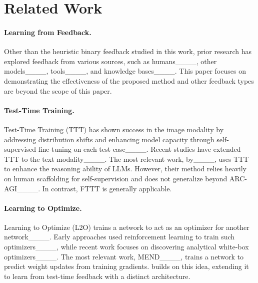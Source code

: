 \section{Related Work}
\paragraph{Learning from Feedback.}

Other than the heuristic binary feedback studied in this work, prior research has explored feedback from various sources, such as humans____, other models____, tools____, and knowledge bases____. This paper focuses on demonstrating the effectiveness of the proposed method and other feedback types are beyond the scope of this paper.

\paragraph{Test-Time Training.}

Test-Time Training (TTT) has shown success in the image modality by addressing distribution shifts and enhancing model capacity through self-supervised fine-tuning on each test case____. Recent studies have extended TTT to the text modality____. The most relevant work, by____, uses TTT to enhance the reasoning ability of LLMs. However, their method relies heavily on human scaffolding for self-supervision and does not generalize beyond ARC-AGI____. In contrast, FTTT is generally applicable.

\paragraph{Learning to Optimize.}

Learning to Optimize (L2O) trains a network to act as an optimizer for another network____. Early approaches used reinforcement learning to train such optimizers____, while recent work focuses on discovering analytical white-box optimizers____. The most relevant work, MEND____, trains a network to predict weight updates from training gradients. \method{} builds on this idea, extending it to learn from test-time feedback with a distinct architecture.